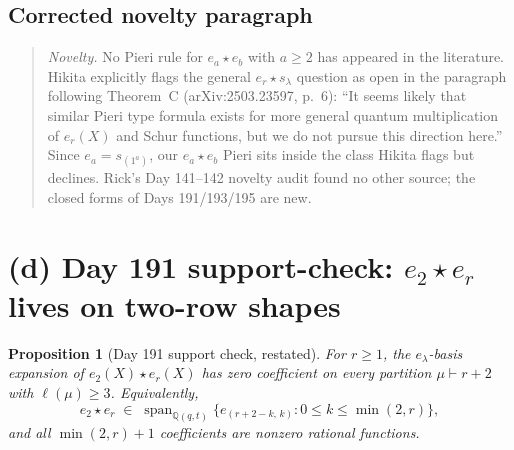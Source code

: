 \documentclass[11pt]{article}
\newtheorem{proposition}[theorem]{Proposition}
\theoremstyle{definition}
\begin{document}
\subsection*{Corrected novelty paragraph}
\begin{quote}\small
\textit{Novelty.} No Pieri rule for $e_a\star e_b$ with $a\ge 2$ has
appeared in the literature. Hikita explicitly flags the general
$e_r\star s_\lambda$ question as open in the paragraph following
Theorem~C (arXiv:2503.23597, p.~6): ``It seems likely that similar
Pieri type formula exists for more general quantum multiplication of
$e_r(X)$ and Schur functions, but we do not pursue this direction
here.'' Since $e_a = s_{(1^a)}$, our $e_a\star e_b$ Pieri sits inside
the class Hikita flags but declines. Rick's Day 141--142 novelty
audit found no other source; the closed forms of Days 191/193/195
are new.
\end{quote}

\section{(d) Day 191 support-check: $e_2\star e_r$ lives on two-row shapes}
\label{sec:day191-support}

\begin{proposition}[Day 191 support check, restated]\label{prop:day191-support}
For $r\ge 1$, the $e_\lambda$-basis expansion of $e_2(X)\star e_r(X)$
has zero coefficient on every partition $\mu\vdash r+2$ with
$\ell(\mu)\ge 3$. Equivalently,
\begin{equation}\label{eq:e2-er-support}
  e_2\star e_r \;\in\; \operatorname{span}_{\mathbb Q(q,t)}
      \bigl\{ e_{(r+2-k,\,k)} : 0\le k \le \min(2,r) \bigr\},
\end{equation}
and all $\min(2,r)+1$ coefficients are nonzero rational functions.
\end{proposition}
\end{document}
